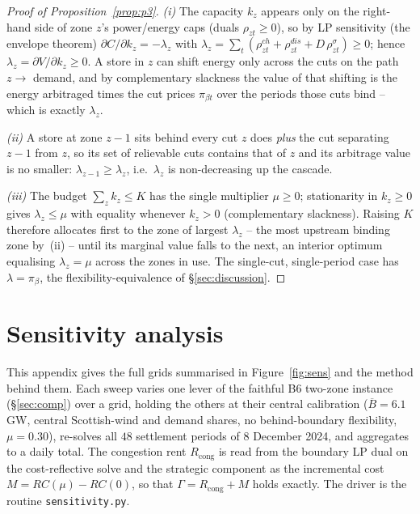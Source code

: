 \documentclass[review,3p,times]{elsarticle}
\theoremstyle{plain}
\theoremstyle{definition}
\begin{document}
\begin{proof}[Proof of Proposition~\ref{prop:p3}]
\emph{(i)} The capacity $k_z$ appears only on the right-hand side of zone $z$'s
power/energy caps (duals $\rho_{zt}\ge0$), so by LP sensitivity (the envelope
theorem) $\partial C/\partial k_z=-\lambda_z$ with
$\lambda_z=\sum_t(\rho^{ch}_{zt}+\rho^{dis}_{zt}+D\,\rho^{\sigma}_{zt})\ge0$; hence
$\lambda_z=\partial V/\partial k_z\ge0$. A store in $z$ can shift energy only
across the cuts on the path $z\to$ demand, and by complementary slackness the
value of that shifting is the energy arbitraged times the cut prices
$\pi_{\beta t}$ over the periods those cuts bind -- which is exactly $\lambda_z$.


\emph{(ii)} A store at zone $z-1$ sits behind every cut $z$ does \emph{plus} the
cut separating $z-1$ from $z$, so its set of relievable cuts contains that of
$z$ and its arbitrage value is no smaller: $\lambda_{z-1}\ge\lambda_z$, i.e.\
$\lambda_z$ is non-decreasing up the cascade.


\emph{(iii)} The budget $\sum_z k_z\le K$ has the single multiplier $\mu\ge0$;
stationarity in $k_z\ge0$ gives $\lambda_z\le\mu$ with equality whenever $k_z>0$
(complementary slackness). Raising $K$ therefore allocates first to the zone of
largest $\lambda_z$ -- the most upstream binding zone by~(ii) -- until its marginal
value falls to the next, an interior optimum equalising $\lambda_z=\mu$ across the
zones in use. The single-cut, single-period case has $\lambda=\pi_\beta$, the
flexibility-equivalence of \S\ref{sec:discussion}.
\end{proof}

\section{Sensitivity analysis}\label{app:sensitivity}

This appendix gives the full grids summarised in Figure~\ref{fig:sens} and the
method behind them. Each sweep varies one lever of the faithful B6 two-zone
instance (\S\ref{sec:comp}) over a grid, holding the others at their central
calibration ($\overline B=6.1$\,GW, central Scottish-wind and demand shares, no
behind-boundary flexibility, $\mu=0.30$), re-solves all $48$ settlement periods
of 8 December 2024, and aggregates to a daily total. The congestion rent
$R_{\mathrm{cong}}$ is read from the boundary LP dual on the cost-reflective solve
and the strategic component as the incremental cost $M=RC(\mu)-RC(0)$, so that
$\Gamma=R_{\mathrm{cong}}+M$ holds exactly. The driver is the routine
\texttt{sensitivity.py}.
\end{document}
